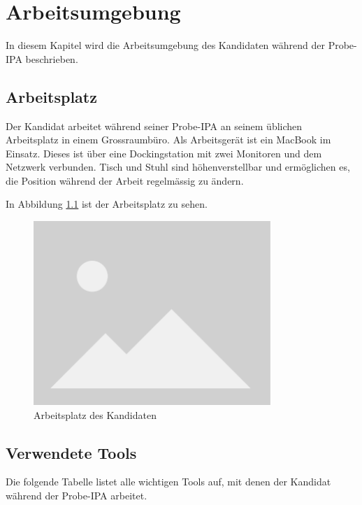 \chapter{Arbeitsumgebung}\label{ch:arbeitsumgebung}
In diesem Kapitel wird die Arbeitsumgebung des Kandidaten während der Probe-IPA beschrieben.

\section{Arbeitsplatz}\label{sec:arbeitsplatz}
Der Kandidat arbeitet während seiner Probe-IPA an seinem üblichen Arbeitsplatz in einem Grossraumbüro.
Als Arbeitsgerät ist ein MacBook im Einsatz.
Dieses ist über eine Dockingstation mit zwei Monitoren und dem Netzwerk verbunden.
Tisch und Stuhl sind höhenverstellbar und ermöglichen es, die Position während der Arbeit regelmässig zu ändern.

In Abbildung \ref{fig:workspace} ist der Arbeitsplatz zu sehen.

\begin{figure}[H]
    \centering
    \includegraphics[width=0.8\textwidth]{ressourcen/placeholder}
    \caption{Arbeitsplatz des Kandidaten}\label{fig:workspace}
\end{figure}

\section{Verwendete Tools}\label{sec:verwendete-tools}
Die folgende Tabelle listet alle wichtigen Tools auf, mit denen der Kandidat während der Probe-IPA arbeitet.

